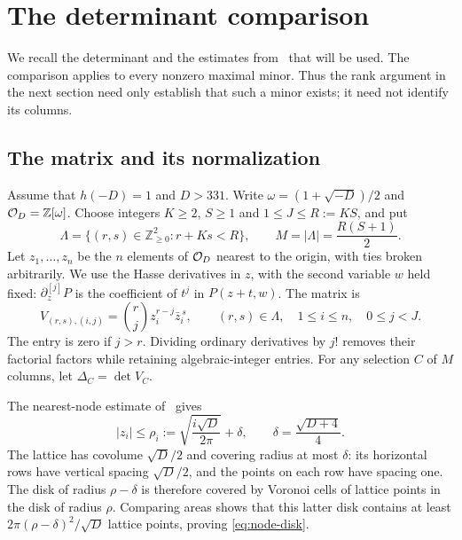 \section{The determinant comparison}\label{sec:comparison}
We recall the determinant and the estimates from~\cite{chung498} that will
be used. The comparison applies to every nonzero maximal minor. Thus the
rank argument in the next section need only establish that such a minor
exists; it need not identify its columns.

\subsection{The matrix and its normalization}
Assume that $h(-D)=1$ and $D>331$. Write
$\omega=(1+\sqrt{-D})/2$ and $\mathcal O_D=\mathbb Z[\omega]$.
Choose integers $K\geq2$, $S\geq1$ and $1\leq J\leq R:=KS$, and put
\begin{equation}\label{eq:triangle}
 \Lambda=\{(r,s)\in\mathbb Z_{\geq0}^2:r+Ks<R\},\qquad
 M=|\Lambda|=\frac{R(S+1)}2.
\end{equation}
Let $z_1,\ldots,z_n$ be the $n$ elements of $\mathcal O_D$ nearest to the origin,
with ties broken arbitrarily. We use the Hasse derivatives in $z$, with the
second variable $w$ held fixed: $\partial_z^{[j]}P$ is the coefficient of
$t^j$ in $P(z+t,w)$. The matrix is
\begin{equation}\label{eq:jet-matrix}
 V_{(r,s),(i,j)}=\binom rjz_i^{r-j}\bar z_i^{\,s},
 \qquad (r,s)\in\Lambda,\quad 1\leq i\leq n,\quad 0\leq j<J.
\end{equation}
The entry is zero if $j>r$. Dividing ordinary derivatives by $j!$ removes their factorial
factors while retaining algebraic-integer entries. For any selection
$C$ of $M$ columns, let $\Delta_C=\det V_C$.

The nearest-node estimate of~\cite[Lemma 2.5]{chung498} gives
\begin{equation}\label{eq:node-disk}
 |z_i|\leq\rho_i:=\sqrt{\frac{i\sqrt D}{2\pi}}+\delta,
 \qquad \delta=\frac{\sqrt{D+4}}4.
\end{equation}
The lattice has covolume $\sqrt D/2$ and covering radius
at most $\delta$: its horizontal rows have vertical spacing $\sqrt D/2$,
and the points on each row have spacing one. The disk of radius
$\rho-\delta$ is therefore covered by Voronoi cells of lattice points in
the disk of radius $\rho$. Comparing areas shows that this latter disk
contains at least $2\pi(\rho-\delta)^2/\sqrt D$ lattice points, proving
\eqref{eq:node-disk}.

